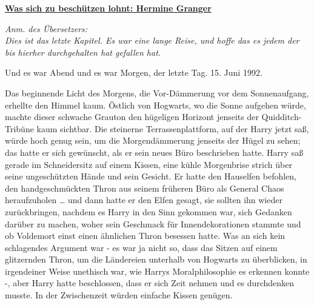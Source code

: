 

\hypertarget{was-sich-zu-beschuxfctzen-lohnt-hermine-granger}{%

\textbf{\uline{Was sich zu beschützen lohnt: Hermine Granger}}

\emph{Anm. des Übersetzers:}\\ \emph{Dies ist das letzte Kapitel. Es war eine lange Reise, und hoffe das es jedem der bis hierher durchgehalten hat gefallen hat.}

Und es war Abend und es war Morgen, der letzte Tag. 15. Juni 1992.

Das beginnende Licht des Morgens, die Vor-Dämmerung vor dem Sonnenaufgang, erhellte den Himmel kaum. Östlich von Hogwarts, wo die Sonne aufgehen würde, machte dieser schwache Grauton den hügeligen Horizont jenseits der Quidditch-Tribüne kaum sichtbar. Die steinerne Terrassenplattform, auf der Harry jetzt saß, würde hoch genug sein, um die Morgendämmerung jenseits der Hügel zu sehen; das hatte er sich gewünscht, als er sein neues Büro beschrieben hatte. Harry saß gerade im Schneidersitz auf einem Kissen, eine kühle Morgenbrise strich über seine ungeschützten Hände und sein Gesicht. Er hatte den Hauselfen befohlen, den handgeschmückten Thron aus seinem früheren Büro als General Chaos heraufzuholen … und dann hatte er den Elfen gesagt, sie sollten ihn wieder zurückbringen, nachdem es Harry in den Sinn gekommen war, sich Gedanken darüber zu machen, woher sein Geschmack für Innendekorationen stammte und ob Voldemort einst einen ähnlichen Thron besessen hatte. Was an sich kein schlagendes Argument war - es war ja nicht so, dass das Sitzen auf einem glitzernden Thron, um die Ländereien unterhalb von Hogwarts zu überblicken, in irgendeiner Weise unethisch war, wie Harrys Moralphilosophie es erkennen konnte -, aber Harry hatte beschlossen, dass er sich Zeit nehmen und es durchdenken musste. In der Zwischenzeit würden einfache Kissen genügen.

}
